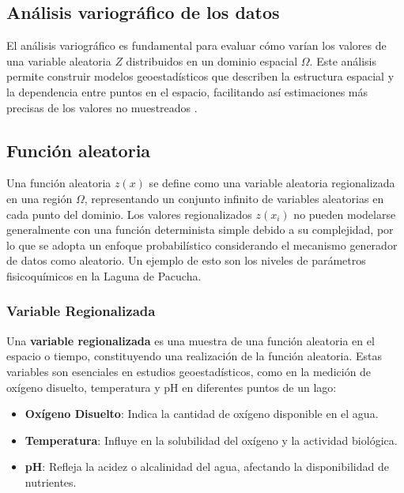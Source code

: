\subsection{Análisis variográfico de los datos}
El análisis variográfico es fundamental para evaluar cómo varían los valores de una variable aleatoria \( Z \) distribuidos en un dominio espacial \(\Omega\). Este análisis permite construir modelos geoestadísticos que describen la estructura espacial y la dependencia entre puntos en el espacio, facilitando así estimaciones más precisas de los valores no muestreados \cite{Viera2002}.



\subsection{Función aleatoria}

Una función aleatoria \(z(x)\) se define como una variable aleatoria regionalizada en una región \(\Omega\), representando un conjunto infinito de variables aleatorias en cada punto del dominio. Los valores regionalizados \(z(x_i)\) no pueden modelarse generalmente con una función determinista simple debido a su complejidad, por lo que se adopta un enfoque probabilístico considerando el mecanismo generador de datos como aleatorio. Un ejemplo de esto son los niveles de parámetros fisicoquímicos en la Laguna de Pacucha.

\subsubsection*{Variable Regionalizada}

Una \textbf{variable regionalizada} es una muestra de una función aleatoria en el espacio o tiempo, constituyendo una realización de la función aleatoria. Estas variables son esenciales en estudios geoestadísticos, como en la medición de oxígeno disuelto, temperatura y pH en diferentes puntos de un lago:

\begin{itemize}
    \item \textbf{Oxígeno Disuelto}: Indica la cantidad de oxígeno disponible en el agua.
    \item \textbf{Temperatura}: Influye en la solubilidad del oxígeno y la actividad biológica.
    \item \textbf{pH}: Refleja la acidez o alcalinidad del agua, afectando la disponibilidad de nutrientes.
\end{itemize}

